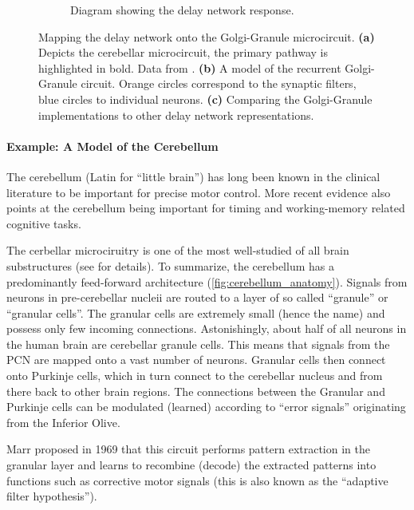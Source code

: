 \documentclass[10pt,letterpaper,oneside]{article}
\begin{document}
\begin{figure}[p]
\begin{subfigure}{\textwidth}
		\caption{Diagram showing the delay network response.}
		\label{fig:delay_network_response}
	\end{subfigure}
	\caption{Mapping the delay network onto the Golgi-Granule microcircuit. \textbf{(a)} Depicts the cerebellar microcircuit, the primary pathway is highlighted in bold. Data from \cite{ito2010cerebellar,llinas2010olivocerebellar}. \textbf{(b)} A model of the recurrent Golgi-Granule circuit. Orange circles correspond to the synaptic filters, blue circles to individual neurons. \textbf{(c)} Comparing the Golgi-Granule implementations to other delay network representations.}
\end{figure}
\paragraph{Example: A Model of the Cerebellum}
The cerebellum (Latin for \enquote{little brain}) has long been known in the clinical literature to be important for precise motor control. More recent evidence also points at the cerebellum being important for timing and working-memory related cognitive tasks.

The cerbellar microciruitry is one of the most well-studied of all brain substructures (see \cite{ito2010cerebellar,llinas2010olivocerebellar} for details). To summarize, the cerebellum has a predominantly feed-forward architecture (\cref{fig:cerebellum_anatomy}). Signals from neurons in pre-cerebellar nucleii are routed to a layer of so called \enquote{granule} or \enquote{granular cells}. The granular cells are extremely small (hence the name) and possess only few incoming connections. Astonishingly, about half of all neurons in the human brain are cerebellar granule cells. This means that signals from the PCN are mapped onto a vast number of neurons. Granular cells then connect onto Purkinje cells, which in turn connect to the cerebellar nucleus and from there back to other brain regions. The connections between the Granular and Purkinje cells can be modulated (learned) according to \enquote{error signals} originating from the Inferior Olive.

Marr proposed in 1969 \cite{marr1969theory} that this circuit performs pattern extraction in the granular layer and learns to recombine (decode) the extracted patterns into functions such as corrective motor signals (this is also known as the \enquote{adaptive filter hypothesis}).
\end{document}
